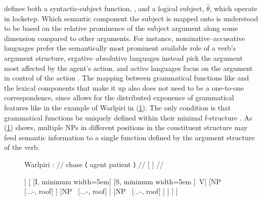 \Lfg{} defines both a syntactic-subject function, \Subj{}, and a logical
subject, $\hat{\theta}$, which operate in lockstep. Which semantic component
the subject is mapped onto is understood to be based on the relative prominence
of the subject argument along some dimension compared to other arguments. For
instance, nominative--accusative languages prefer the semantically most
prominent available role of a verb's argument structure, ergative--absolutive
languages instead pick the argument most affected by the agent's action, and
active languages focus on the argument in control of the action
\citep[95--96]{bresnan2016}. The mapping between grammatical functions like
\Subj{} and the lexical components that make it up also does not need to be a
one-to-one correspondence, since \Lfg{} allows for the distributed exponence of
grammatical features like in the example of Warlpiri in (\ref{ex:warlastruct}).
The only condition is that grammatical functions be uniquely defined within
their minimal f-structure \citep[45]{bresnan2016}. As (\ref{ex:warlastruct})
shows, multiple NPs in different positions in the constituent structure may
feed semantic information to a single function defined by the argument
structure of the verb.

\begin{figure}[htp]
\ex\label{ex:warlastruct}
\begingl[glwordalign=center]
\glpreamble Warlpiri \citep[325]{bresnan2016}: //
\gla {~\hspace{1.5em}} {} chase {\quad\normalfont ⟨} agent {\quad} patient 
{\normalfont ⟩} {} //
\glb {} {[}
	\Pred{}
	{}
	\Subj{}
	{}
	\Obj{}
	{}
	{]} //
\endgl

\begin{forest}
[IP
	[{NP~\tikzmark{warlastruct_ERGNP1}}
		[{...-\Erg{}}, roof]
	]
	[
		[I, minimum width=5em]
		[S, minimum width=5em
			[{~V}]
			[{NP~}
				[{...-\Abs{}}, roof]
			]
			[{NP~}
				[{...-\Erg{}}, roof]
			]
			[{NP~}
				[{...-\Abs{}}, roof]
			]
		]
	]
]
\end{forest}
\xe
\end{figure}

